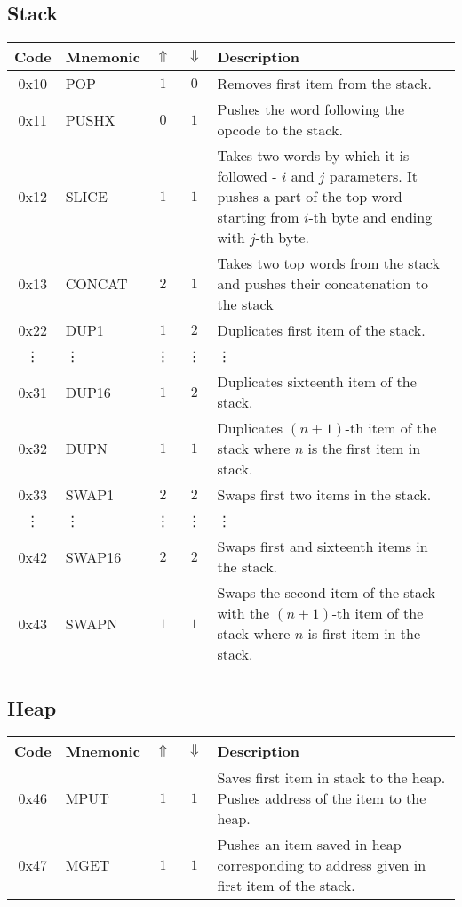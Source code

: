 \documentclass[12pt,a4paper]{article}
\begin{document}
\subsection{Stack}
\begin{tabularx}{\textwidth}{ c l c c p{7cm} }
\textbf{Code} & \textbf{Mnemonic} & \textbf{$\Uparrow$} & \textbf{$\Downarrow$} & \textbf{Description} \\
\hline
0x10 & POP & $1$ & $0$ & Removes first item from the stack. \\
\hline
0x11 & PUSHX & $0$ & $1$ & Pushes the word following the opcode to the stack. \\
\hline
0x12 & SLICE & $1$ & $1$ & Takes two words by which it is followed - $i$ and $j$ parameters. It pushes a part of the top word starting from $i$-th byte and ending with $j$-th byte.   \\
\hline
0x13 & CONCAT & $2$ & $1$ & Takes two top words from the stack and pushes their concatenation to the stack \\
\hline
0x22 & DUP1 & $1$ & $2$ & Duplicates first item of the stack. \\
\vdots & \vdots & \vdots & \vdots & \vdots \\
0x31 & DUP16 & $1$ & $2$ & Duplicates sixteenth item of the stack. \\
\hline
0x32 & DUPN & $1$ & $1$ & Duplicates $(n+1)$-th item of the stack where $n$ is the first item in stack. \\
\hline
0x33 & SWAP1 & $2$ & $2$ & Swaps first two items in the stack. \\
\vdots & \vdots & \vdots & \vdots & \vdots \\
0x42 & SWAP16 & $2$ & $2$ & Swaps first and sixteenth items in the stack. \\
\hline
0x43 & SWAPN & $1$ & $1$ & Swaps the second item of the stack with the $(n+1)$-th item of the stack where $n$ is first item in the stack. \\
\hline
\end{tabularx}

\subsection{Heap}
\begin{tabularx}{\textwidth}{ c l c c p{7cm} }
\textbf{Code} & \textbf{Mnemonic} & \textbf{$\Uparrow$} & \textbf{$\Downarrow$} & \textbf{Description} \\
\hline
0x46 & MPUT & $1$ & $1$ & Saves first item in stack to the heap. Pushes address of the item to the heap. \\
\hline
0x47 & MGET & $1$ & $1$ & Pushes an item saved in heap corresponding to address given in first item of the stack.  \\
\hline
\end{tabularx}
\end{document}
